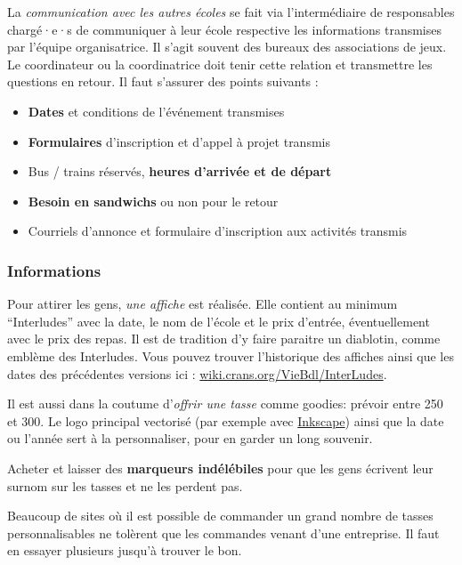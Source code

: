 La \emph{communication avec les autres écoles} se fait via l'intermédiaire de responsables chargé·e·s de communiquer à leur école respective les informations transmises par l'équipe organisatrice. Il s'agit souvent des bureaux des associations de jeux. Le coordinateur ou la coordinatrice doit tenir cette relation et transmettre les questions en retour. Il faut s'assurer des points suivants :
\begin{itemize}
    \item \textbf{Dates} et conditions de l'événement transmises
    \item \textbf{Formulaires} d'inscription et d'appel à projet transmis
    \item Bus / trains réservés, \textbf{heures d'arrivée et de départ}
    \item \textbf{Besoin en sandwichs} ou non pour le retour
    \item Courriels d'annonce et formulaire d'inscription aux activités transmis
\end{itemize}

\subsubsection*{Informations}

Pour attirer les gens, \emph{une affiche} est réalisée. Elle contient au minimum ``Interludes'' avec la date, le nom de l'école et le prix d'entrée, éventuellement avec le prix des repas. Il est de tradition d'y faire paraitre un diablotin, comme emblème des Interludes. Vous pouvez trouver l'historique des affiches ainsi que les dates des précédentes versions ici : \href{https://wiki.crans.org/VieBdl/InterLudes}{wiki.crans.org/VieBdl/InterLudes}.

Il est aussi dans la coutume d'\emph{offrir une tasse} comme goodies: prévoir entre 250 et 300. Le logo principal vectorisé (par exemple avec \href{https://inkscape.org/fr/}{Inkscape}) ainsi que la date ou l'année sert à la personnaliser, pour en garder un long souvenir.

\begin{Afaire}{}{}
Acheter et laisser des \textbf{marqueurs indélébiles} pour que les gens écrivent leur surnom sur les tasses et ne les perdent pas.
\end{Afaire}

\begin{Asavoir}
Beaucoup de sites où il est possible de commander un grand nombre de tasses personnalisables ne tolèrent que les commandes venant d'une entreprise. Il faut en essayer plusieurs jusqu'à trouver le bon.
\end{Asavoir}

